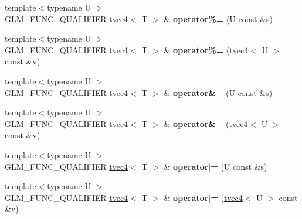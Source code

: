\begin{DoxyCompactItemize}
\item 
\hypertarget{structglm_1_1detail_1_1tvec4_a379657cba0ba19e264f2716a22de8266}{}{\footnotesize template$<$typename U $>$ }\\G\+L\+M\+\_\+\+F\+U\+N\+C\+\_\+\+Q\+U\+A\+L\+I\+F\+I\+E\+R \hyperlink{structglm_1_1detail_1_1tvec4}{tvec4}$<$ T $>$ \& {\bfseries operator\%=} (U const \&s)\label{structglm_1_1detail_1_1tvec4_a379657cba0ba19e264f2716a22de8266}

\item 
\hypertarget{structglm_1_1detail_1_1tvec4_a88fdc82f178bc1b31e42277d969f6b85}{}{\footnotesize template$<$typename U $>$ }\\G\+L\+M\+\_\+\+F\+U\+N\+C\+\_\+\+Q\+U\+A\+L\+I\+F\+I\+E\+R \hyperlink{structglm_1_1detail_1_1tvec4}{tvec4}$<$ T $>$ \& {\bfseries operator\%=} (\hyperlink{structglm_1_1detail_1_1tvec4}{tvec4}$<$ U $>$ const \&v)\label{structglm_1_1detail_1_1tvec4_a88fdc82f178bc1b31e42277d969f6b85}

\item 
\hypertarget{structglm_1_1detail_1_1tvec4_a3280b9b1033cb5250630e6dc9e16bcd0}{}{\footnotesize template$<$typename U $>$ }\\G\+L\+M\+\_\+\+F\+U\+N\+C\+\_\+\+Q\+U\+A\+L\+I\+F\+I\+E\+R \hyperlink{structglm_1_1detail_1_1tvec4}{tvec4}$<$ T $>$ \& {\bfseries operator\&=} (U const \&s)\label{structglm_1_1detail_1_1tvec4_a3280b9b1033cb5250630e6dc9e16bcd0}

\item 
\hypertarget{structglm_1_1detail_1_1tvec4_ace770b5ddd6ed3d6de31db79f1d98684}{}{\footnotesize template$<$typename U $>$ }\\G\+L\+M\+\_\+\+F\+U\+N\+C\+\_\+\+Q\+U\+A\+L\+I\+F\+I\+E\+R \hyperlink{structglm_1_1detail_1_1tvec4}{tvec4}$<$ T $>$ \& {\bfseries operator\&=} (\hyperlink{structglm_1_1detail_1_1tvec4}{tvec4}$<$ U $>$ const \&v)\label{structglm_1_1detail_1_1tvec4_ace770b5ddd6ed3d6de31db79f1d98684}

\item 
\hypertarget{structglm_1_1detail_1_1tvec4_a8822b05828505f64f113004ead4b3bee}{}{\footnotesize template$<$typename U $>$ }\\G\+L\+M\+\_\+\+F\+U\+N\+C\+\_\+\+Q\+U\+A\+L\+I\+F\+I\+E\+R \hyperlink{structglm_1_1detail_1_1tvec4}{tvec4}$<$ T $>$ \& {\bfseries operator$\vert$=} (U const \&s)\label{structglm_1_1detail_1_1tvec4_a8822b05828505f64f113004ead4b3bee}

\item 
\hypertarget{structglm_1_1detail_1_1tvec4_a816ef935fcc5a08ba084e314bb1928f0}{}{\footnotesize template$<$typename U $>$ }\\G\+L\+M\+\_\+\+F\+U\+N\+C\+\_\+\+Q\+U\+A\+L\+I\+F\+I\+E\+R \hyperlink{structglm_1_1detail_1_1tvec4}{tvec4}$<$ T $>$ \& {\bfseries operator$\vert$=} (\hyperlink{structglm_1_1detail_1_1tvec4}{tvec4}$<$ U $>$ const \&v)\label{structglm_1_1detail_1_1tvec4_a816ef935fcc5a08ba084e314bb1928f0}


\end{DoxyCompactItemize}
